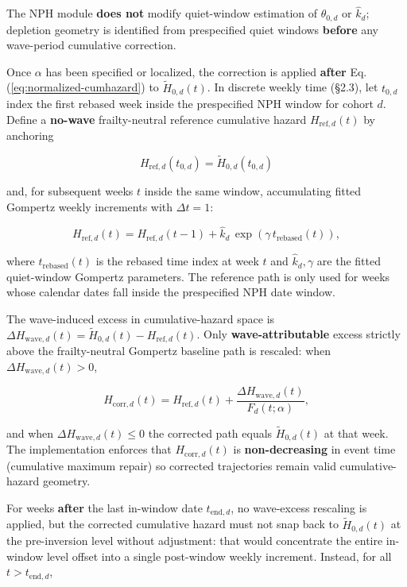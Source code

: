 \documentclass[
]{article}
\begin{document}
The NPH module \textbf{does not} modify quiet-window estimation of
\(\theta_{0,d}\) or \(\hat k_d\); depletion geometry is identified from
prespecified quiet windows \textbf{before} any wave-period cumulative
correction.

Once \(\alpha\) has been specified or localized, the correction is
applied \textbf{after} Eq. (\ref{eq:normalized-cumhazard}) to
\(\tilde H_{0,d}(t)\). In discrete weekly time (§2.3), let \(t_{0,d}\)
index the first rebased week inside the prespecified NPH window for
cohort \(d\). Define a \textbf{no-wave} frailty-neutral reference
cumulative hazard \(H_{\mathrm{ref},d}(t)\) by anchoring

\[
H_{\mathrm{ref},d}(t_{0,d})=\tilde H_{0,d}(t_{0,d})
\]

and, for subsequent weeks \(t\) inside the same window, accumulating
fitted Gompertz weekly increments with \(\Delta t=1\):

\[
H_{\mathrm{ref},d}(t)=H_{\mathrm{ref},d}(t-1)+\hat{k}_d\,\exp\!\left(\gamma\, t_{\mathrm{rebased}}(t)\right),
\]

where \(t_{\mathrm{rebased}}(t)\) is the rebased time index at week
\(t\) and \(\hat{k}_d,\gamma\) are the fitted quiet-window Gompertz
parameters. The reference path is only used for weeks whose calendar
dates fall inside the prespecified NPH date window.

The wave-induced excess in cumulative-hazard space is
\(\Delta H_{\mathrm{wave},d}(t)=\tilde H_{0,d}(t)-H_{\mathrm{ref},d}(t)\).
Only \textbf{wave-attributable} excess strictly above the
frailty-neutral Gompertz baseline path is rescaled: when
\(\Delta H_{\mathrm{wave},d}(t)>0\),

\[
H_{\mathrm{corr},d}(t)=H_{\mathrm{ref},d}(t)+\frac{\Delta H_{\mathrm{wave},d}(t)}{F_d(t;\alpha)},
\]

and when \(\Delta H_{\mathrm{wave},d}(t)\le 0\) the corrected path
equals \(\tilde H_{0,d}(t)\) at that week. The implementation enforces
that \(H_{\mathrm{corr},d}(t)\) is \textbf{non-decreasing} in event time
(cumulative maximum repair) so corrected trajectories remain valid
cumulative-hazard geometry.

For weeks \textbf{after} the last in-window date \(t_{\mathrm{end},d}\),
no wave-excess rescaling is applied, but the corrected cumulative hazard
must not snap back to \(\tilde H_{0,d}(t)\) at the pre-inversion level
without adjustment: that would concentrate the entire in-window level
offset into a single post-window weekly increment. Instead, for all
\(t>t_{\mathrm{end},d}\),
\end{document}
